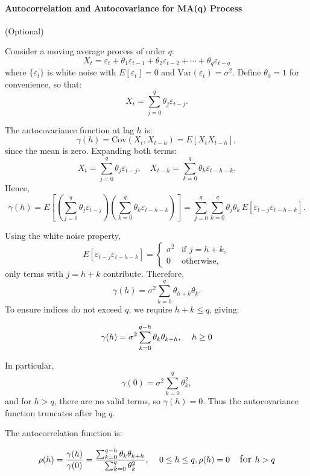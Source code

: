 \documentclass[10pt,a4paper]{article}
\begin{document}
	\paragraph{Autocorrelation and Autocovariance for MA(q) Process}
	(Optional)
	
	
	Consider a moving average process of order $q$:
	\[
	X_t = \varepsilon_t + \theta_1 \varepsilon_{t-1} + \theta_2 \varepsilon_{t-2} + \cdots + \theta_q \varepsilon_{t-q}
	\]
	where $\{\varepsilon_t\}$ is white noise with $E[\varepsilon_t]=0$ and $\mathrm{Var}(\varepsilon_t)=\sigma^2$. Define $\theta_0 = 1$ for convenience, so that:
	\[
	X_t = \sum_{j=0}^{q} \theta_j \varepsilon_{t-j}.
	\]
	
	The autocovariance function at lag $h$ is:
	\[
	\gamma(h) = \mathrm{Cov}(X_t, X_{t-h}) = E[X_t X_{t-h}],
	\]
	since the mean is zero. Expanding both terms:
	\[
	X_t = \sum_{j=0}^{q} \theta_j \varepsilon_{t-j}, \quad
	X_{t-h} = \sum_{k=0}^{q} \theta_k \varepsilon_{t-h-k}.
	\]
	Hence,
	\[
	\gamma(h) = E\left[\left(\sum_{j=0}^{q} \theta_j \varepsilon_{t-j}\right)
	\left(\sum_{k=0}^{q} \theta_k \varepsilon_{t-h-k}\right)\right]
	= \sum_{j=0}^{q} \sum_{k=0}^{q} \theta_j \theta_k \, E[\varepsilon_{t-j}\varepsilon_{t-h-k}].
	\]
	
	Using the white noise property,
	\[
	E[\varepsilon_{t-j}\varepsilon_{t-h-k}] =
	\begin{cases}
	\sigma^2 & \text{if } j = h + k, \\
	0 & \text{otherwise},
	\end{cases}
	\]
	only terms with $j = h + k$ contribute. Therefore,
	\[
	\gamma(h) = \sigma^2 \sum_{k=0}^{q} \theta_{h+k}\theta_k.
	\]
	To ensure indices do not exceed $q$, we require $h+k \le q$, giving:
	
	\begin{align*}
	\large \gamma(h) = \sigma^2 \sum_{k=0}^{q-h} \theta_k \theta_{k+h}, \quad h \ge 0
	\end{align*}
	
	In particular,
	\[
	\gamma(0) = \sigma^2 \sum_{k=0}^{q} \theta_k^2,
	\]
	and for $h > q$, there are no valid terms, so $\gamma(h)=0$. Thus the autocovariance function truncates after lag $q$.
	
	The autocorrelation function is:
	
	\begin{align*}
	\large \rho(h) = \frac{\gamma(h)}{\gamma(0)} =
	\frac{\sum_{k=0}^{q-h} \theta_k \theta_{k+h}}{\sum_{k=0}^{q} \theta_k^2}, \quad 0 \le h \le q,
	\rho(h)=0 \quad \text{for } h>q
	\end{align*}
	
\end{document}
